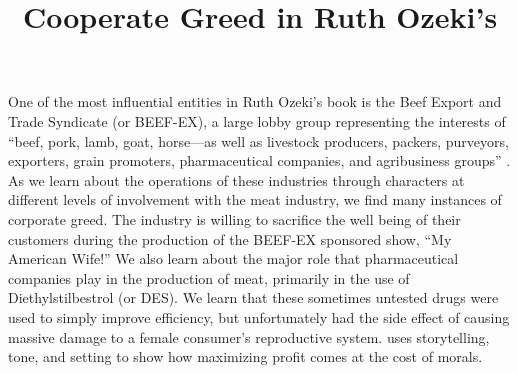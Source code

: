 \documentclass{article}
\title{Cooperate Greed in Ruth Ozeki's \citetitle{ozeki1998my}}
\begin{document}
\makeheader

One of the most influential entities in Ruth Ozeki's book
 is the Beef Export and Trade Syndicate (or BEEF-EX),
a large lobby group representing the interests of ``beef, pork, lamb, goat,
horse—as well as livestock producers, packers, purveyors, exporters, grain
promoters, pharmaceutical companies, and agribusiness groups'' \cite[Ch.
1]{ozeki1998my}. As we learn about the operations of these industries
through characters at different levels of involvement with the meat
industry, we find many instances of corporate greed. The industry is willing
to sacrifice the well being of their customers during the production of the
BEEF-EX sponsored show, ``My American Wife!'' We also learn about the major
role that pharmaceutical companies play in the production of meat, primarily
in the use of Diethylstilbestrol (or DES). We learn that these sometimes untested drugs
were used to simply improve efficiency, but unfortunately had the side
effect of causing massive damage to a female consumer's reproductive system.
\citeauthor{ozeki1998my} uses storytelling, tone, and setting to show how
maximizing profit comes at the cost of morals.


\end{document}
